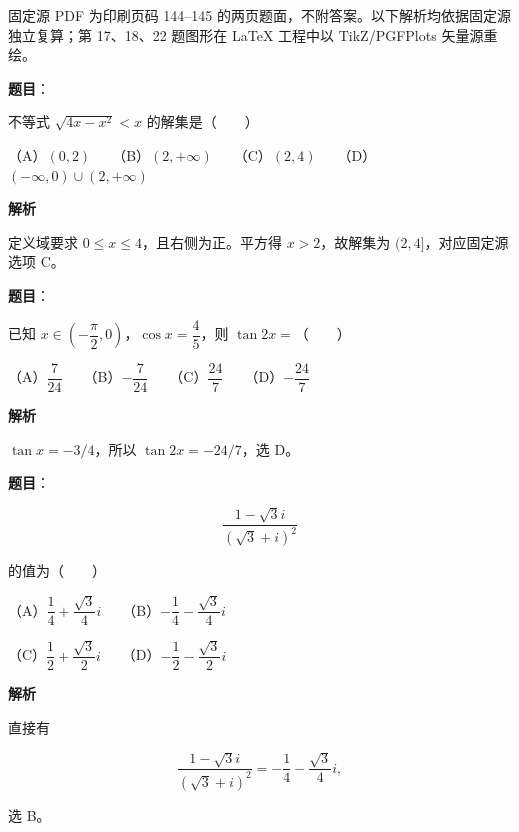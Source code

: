

\begin{gktip}
固定源 PDF 为印刷页码 144–145 的两页题面，不附答案。以下解析均依据固定源独立复算；第 17、18、22 题图形在 LaTeX 工程中以 TikZ/PGFPlots 矢量源重绘。
\end{gktip}


\begin{answer}

\textbf{题目}：

不等式 $\sqrt{4x-x^2}<x$ 的解集是\mbox{（　　）}

（A）$(0,2)$　　（B）$(2,+\infty)$　　（C）$(2,4)$　　（D）$(-\infty,0)\cup(2,+\infty)$

\textbf{解析}

定义域要求 $0\leqslant x\leqslant4$，且右侧为正。平方得 $x>2$，故解集为 $(2,4]$，对应固定源选项 C。

\gkanswer{答案：C（按固定源字面解集为 $(2,4]$；选项端点按原卷印刷核对）。}

\end{answer}
\begin{answer}

\textbf{题目}：

已知 $x\in\left(-\dfrac\pi2,0\right)$，$\cos x=\dfrac45$，则 $\tan2x=$\mbox{（　　）}

（A）$\dfrac7{24}$　　（B）$-\dfrac7{24}$　　（C）$\dfrac{24}{7}$　　（D）$-\dfrac{24}{7}$

\textbf{解析}

$\tan x=-3/4$，所以 $\tan2x=-24/7$，选 D。


\end{answer}
\begin{answer}

\textbf{题目}：

\nopagebreak[4]
\[
\frac{1-\sqrt3 i}{(\sqrt3+i)^2}
\]

的值为\mbox{（　　）}

（A）$\dfrac14+\dfrac{\sqrt3}{4}i$　　（B）$-\dfrac14-\dfrac{\sqrt3}{4}i$

（C）$\dfrac12+\dfrac{\sqrt3}{2}i$　　（D）$-\dfrac12-\dfrac{\sqrt3}{2}i$

\textbf{解析}

直接有

\nopagebreak[4]
\[
\frac{1-\sqrt3i}{(\sqrt3+i)^2}
=-\frac14-\frac{\sqrt3}{4}i,
\]

选 B。


\end{answer}
